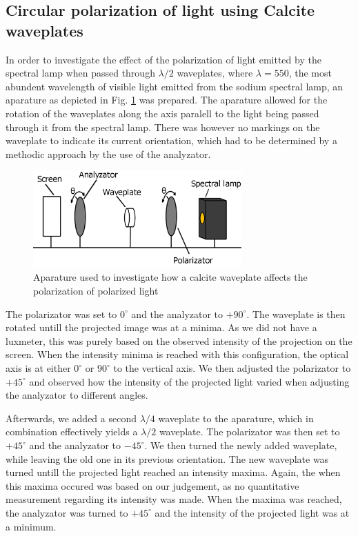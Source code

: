 \documentclass[11pt,a4paper]{article}
\begin{document}
  \subsection{Circular polarization of light using Calcite waveplates}
    In order to investigate the effect of the polarization of light emitted by the spectral lamp when passed through $\lambda /2$ waveplates, where $\lambda=550$, the most abundent wavelength of visible light emitted from the sodium spectral lamp, an aparature as depicted in Fig. \ref{fig:waveplate} was prepared. The aparature allowed for the rotation of the waveplates along the axis paralell to the light being passed through it from the spectral lamp. There was however no markings on the waveplate to indicate its current orientation, which had to be determined by a methodic approach by the use of the analyzator.

    \begin{figure}[H]
      \center
      \includegraphics[width=8cm]{scripts/figs/diagram_6.png}
      \caption{Aparature used to investigate how a calcite waveplate affects the polarization of polarized light}
      \label{fig:waveplate}
    \end{figure}

    The polarizator was set to $0^\circ$ and the analyzator to $+90^\circ$. The waveplate is then rotated untill the projected image was at a minima. As we did not have a luxmeter, this was purely based on the observed intensity of the projection on the screen. When the intensity minima is reached with this configuration, the optical axis is at either $0^\circ$ or $90^\circ$ to the vertical axis. We then adjusted the polarizator to $+45^\circ$ and observed how the intensity of the projected light varied when adjusting the analyzator to different angles.

    Afterwards, we added a second $\lambda/4$ waveplate to the aparature, which in combination effectively yields a $\lambda/2$ waveplate. The polarizator was then set to $+45^\circ$ and the analyzator to $-45^\circ$. We then turned the newly added waveplate, while leaving the old one in its previous orientation. The new waveplate was turned untill the projected light reached an intensity maxima. Again, the when this maxima occured was based on our judgement, as no quantitative measurement regarding its intensity was made. When the maxima was reached, the analyzator was turned to $+45^\circ$ and the intensity of the projected light was at a minimum.
    
\end{document}
